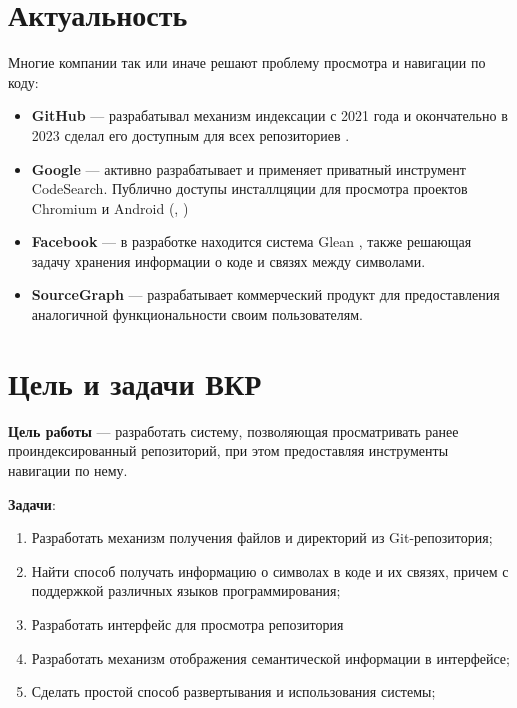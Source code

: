 \documentclass[aspectratio=169,professionalfonts,10pt]{beamer}
\begin{document}
\section{Актуальность}
\begin{frame}{\insertsection}

Многие компании так или иначе решают проблему просмотра и навигации по коду:

\begin{itemize}
    \item \textbf{GitHub}
        — разрабатывал механизм индексации с 2021 года и окончательно в 2023 сделал его доступным для всех репозиториев \cite{github-codesearch}.
    \item \textbf{Google}
        — активно разрабатывает и применяет приватный инструмент CodeSearch. Публично доступы инсталлцяции для просмотра проектов Chromium и Android (\cite{cs-chromium}, \cite{cs-android})
    \item \textbf{Facebook}
        — в разработке находится система Glean \cite{facebook-Glean}, также решающая задачу хранения информации о коде и связях между символами.
    \item \textbf{SourceGraph} \cite{sourcegraph}
        — разрабатывает коммерческий продукт для предоставления аналогичной функциональности своим пользователям.
\end{itemize}

\end{frame}

\section{Цель и задачи ВКР}
\begin{frame}{\insertsection}

\textbf{Цель работы} — разработать систему, позволяющая просматривать ранее проиндексированный репозиторий, при этом предоставляя инструменты навигации по нему.

\textbf{Задачи}:
\begin{enumerate}
    \item Разработать механизм получения файлов и директорий из Git-репозитория;
    \item Найти способ получать информацию о символах в коде и их связях, причем с поддержкой различных языков программирования;
    \item Разработать интерфейс для просмотра репозитория
    \item Разработать механизм отображения семантической информации в интерфейсе;
    \item Сделать простой способ развертывания и использования системы;
\end{enumerate}

\end{frame}
\end{document}
